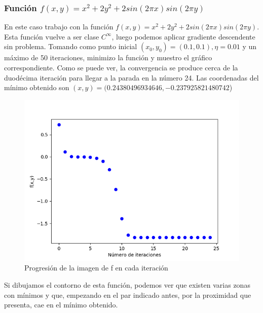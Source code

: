 \subsubsection{Función $f(x,y)=x^2+2y^2+2sin(2\pi x) sin(2\pi y)$}

En este caso trabajo con la función $f(x,y)=x^2+2y^2+2sin(2\pi x) sin(2\pi y)$. Esta función vuelve a ser clase $C^{\infty}$, luego podemos aplicar gradiente descendente sin problema. Tomando como punto inicial $(x_0,y_0) = (0.1,0.1), \eta = 0.01$ y un máximo de 50 iteraciones, minimizo la función y muestro el gráfico correspondiente. Como se puede ver, la convergencia se produce cerca de la duodécima iteración para llegar a la parada en la número 24. Las coordenadas del mínimo obtenido son $(x,y) = (0.24380496934646,-0.237925821480742$)

\begin{figure}[H] %
	\centering
	\includegraphics[scale=0.6]{f1.png}  %
	\caption{Progresión de la imagen de f en cada iteración} 
	\label{fig:f1}
\end{figure}

Si dibujamos el contorno de esta función, podemos ver que existen varias zonas con mínimos y que, empezando en el par indicado antes, por la proximidad que presenta, cae en el mínimo obtenido.

